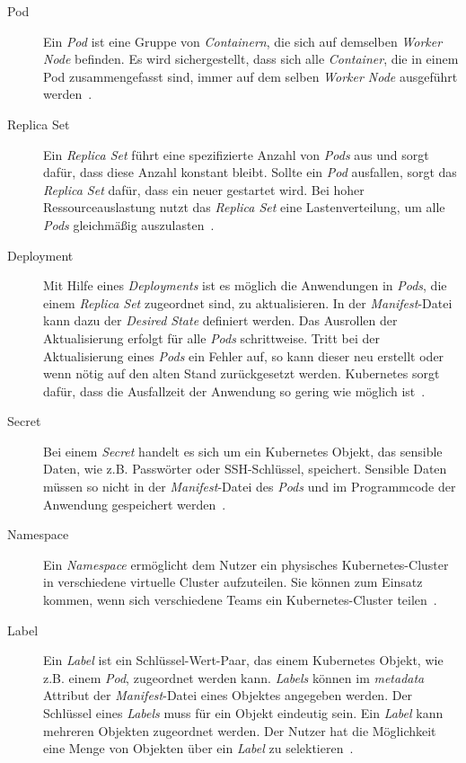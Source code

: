 \begin{description}
      \item[Pod]
            Ein \textit{Pod} ist eine Gruppe von \textit{Containern}, die sich auf demselben \textit{Worker Node} befinden.
            Es wird sichergestellt, dass sich alle \textit{Container}, die in einem Pod zusammengefasst sind,
            immer auf dem selben \textit{Worker Node} ausgeführt werden~\cite{kubernetes-objects-kodekloud,kubernetes-in-action-chapter-3}.
      \item[Replica Set]
            Ein \textit{Replica Set} führt eine spezifizierte Anzahl von \textit{Pods} aus und sorgt dafür, dass diese Anzahl konstant bleibt.
            Sollte ein \textit{Pod} ausfallen, sorgt das \textit{Replica Set} dafür, dass ein neuer gestartet wird. Bei hoher Ressourceauslastung
            nutzt das \textit{Replica Set} eine Lastenverteilung, um alle \textit{Pods} gleichmäßig auszulasten~\cite{kubernetes-replica-set-kubematic}.
      \item[Deployment]
            Mit Hilfe eines \textit{Deployments} ist es möglich die Anwendungen in \textit{Pods}, die einem \textit{Replica Set} zugeordnet sind, zu aktualisieren.
            In der \textit{Manifest}-Datei kann dazu der \textit{Desired State} definiert werden.
            Das Ausrollen der Aktualisierung erfolgt für alle \textit{Pods} schrittweise.
            Tritt bei der Aktualisierung eines \textit{Pods} ein Fehler auf, so kann dieser neu erstellt oder wenn nötig auf den alten Stand zurückgesetzt werden.
            Kubernetes sorgt dafür, dass die Ausfallzeit der Anwendung so gering wie möglich ist~\cite{kubernetes-in-action-chapter-9,kubernetes-deployment-vmware}.
      \item[Secret]
            Bei einem \textit{Secret} handelt es sich um ein Kubernetes Objekt, das sensible Daten, wie z.B. Passwörter oder SSH-Schlüssel, speichert.
            Sensible Daten müssen so nicht in der \textit{Manifest}-Datei des \textit{Pods} und im Programmcode der Anwendung gespeichert werden~\cite{kubernetes-secrets,kubernetes-secrets-medium}.
      \item[Namespace]
            Ein \textit{Namespace} ermöglicht dem Nutzer ein physisches Kubernetes-Cluster in verschiedene virtuelle Cluster aufzuteilen.
            Sie können zum Einsatz kommen, wenn sich verschiedene Teams ein Kubernetes-Cluster teilen~\cite{kubernetes-namespaces-vmware}.
      \item[Label]
            Ein \textit{Label} ist ein Schlüssel-Wert-Paar, das einem Kubernetes Objekt, wie z.B. einem \textit{Pod}, zugeordnet werden kann.
            \textit{Labels} können im \textit{metadata} Attribut der \textit{Manifest}-Datei eines Objektes angegeben werden.
            Der Schlüssel eines \textit{Labels} muss für ein Objekt eindeutig sein. Ein \textit{Label} kann mehreren Objekten zugeordnet werden.
            Der Nutzer hat die Möglichkeit eine Menge von Objekten über ein \textit{Label} zu selektieren~\cite{kubernetes-labels}.
\end{description}

